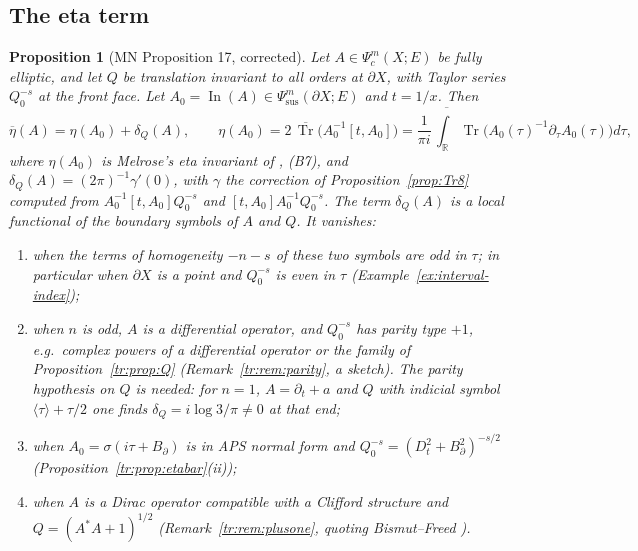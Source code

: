\documentclass[11pt,oneside,reqno]{article}
\DeclareMathOperator{\Tr}{Tr}
\DeclareMathOperator{\In}{In}
\newcommand{\R}{\mathbb R}
\newcommand{\Psic}{\Psi_{c}}
\newcommand{\Psis}{\Psi_{\mathrm{sus}}}
\newcommand{\bTr}{\overline{\Tr}}
\newcommand{\etab}{\overline\eta}
\theoremstyle{plain}
\newtheorem{proposition}[theorem]{Proposition}
\theoremstyle{definition}
\theoremstyle{remark}
\begin{document}
\subsection{The eta term}

\begin{proposition}[MN Proposition 17, corrected]\label{prop:eta}
Let \(A\in\Psic^m(X;E)\) be fully elliptic, and let \(Q\) be translation
invariant to all orders at \(\partial X\), with Taylor series \(Q_0^{-s}\)
at the front face. Let \(A_0=\In(A)\in\Psis^m(\partial X;E)\) and
\(t=1/x\). Then
\[
 \etab(A)=\eta(A_0)+\delta_Q(A),\qquad
 \eta(A_0)=2\,\bTr\bigl(A_0^{-1}[t,A_0]\bigr)=\frac1{\pi i}\,
 \overline{\int_{\R}}\Tr\bigl(A_0(\tau)^{-1}\partial_\tau A_0(\tau)\bigr)
 d\tau ,
\]
where \(\eta(A_0)\) is Melrose's eta invariant of \cite{MelroseEta}, (B7),
and \(\delta_Q(A)=(2\pi)^{-1}\gamma'(0)\), with \(\gamma\) the correction
of Proposition~\ref{prop:Tr8} computed from \(A_0^{-1}[t,A_0]Q_0^{-s}\)
and \([t,A_0]A_0^{-1}Q_0^{-s}\). The term \(\delta_Q(A)\) is a local
functional of the boundary symbols of \(A\) and \(Q\). It vanishes:
\begin{enumerate}
\item when the terms of homogeneity \(-n-s\) of these two symbols are odd
in \(\tau\); in particular when \(\partial X\) is a point and \(Q_0^{-s}\)
is even in \(\tau\) (Example~\ref{ex:interval-index});
\item when \(n\) is odd, \(A\) is a differential operator, and \(Q_0^{-s}\)
has parity type \(+1\), e.g.\ complex powers of a differential operator or
the family of Proposition~\ref{tr:prop:Q} (Remark~\ref{tr:rem:parity}, a
sketch). The parity hypothesis on \(Q\) is needed: for \(n=1\),
\(A=\partial_t+a\) and \(Q\) with indicial symbol
\(\langle\tau\rangle+\tau/2\) one finds \(\delta_Q=i\log3/\pi\neq0\) at
that end;
\item when \(A_0=\sigma(i\tau+B_\partial)\) is in APS normal form and
\(Q_0^{-s}=(D_t^2+B_\partial^2)^{-s/2}\) (Proposition~\ref{tr:prop:etabar}(ii));
\item when \(A\) is a Dirac operator compatible with a Clifford structure
and \(Q=(A^*A+1)^{1/2}\) (Remark~\ref{tr:rem:plusone}, quoting
Bismut--Freed \cite{BismutFreed}).
\end{enumerate}
\end{proposition}
\end{document}
